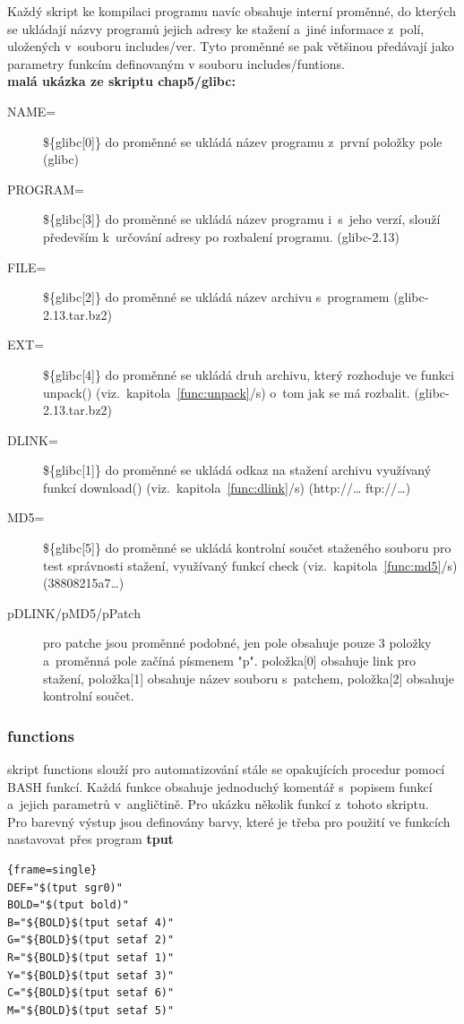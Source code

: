 \documentclass[a4paper,12pt]{article}
\newcommand{\odkazNaKapitolu}[1]{(viz.~kapitola~\ref{#1}/s\pageref{#1})}
\renewcommand{\b}[1]{\textbf{#1}} %
\newenvironment{codeframe}{%
  \begin{Sbox} 
    \begin{minipage} 
      {\columnwidth-\leftmargin-\rightmargin-2\fboxsep-2\fboxrule-4pt} 
}{%

  \end{minipage} 
  \end{Sbox} 
  \begin{center} 
    \fcolorbox{black}{codeback}{\TheSbox} 
  \end{center} 
}
\begin{document}
Každý skript ke kompilaci programu navíc obsahuje interní proměnné, do kterých se ukládají názvy programů jejich adresy ke stažení a~jiné informace z~polí, uložených v~souboru includes/ver. Tyto proměnné se pak většinou předávají jako parametry funkcím definovaným v souboru includes/funtions.\\

\b{malá ukázka ze skriptu chap5/glibc:}
\begin{description}
 \item[NAME=]\$\{glibc[0]\} do proměnné se ukládá název programu z~první položky pole (glibc)
 \item[PROGRAM=]\$\{glibc[3]\} do proměnné se ukládá název programu i~s~jeho verzí, slouží především k~určování adresy po rozbalení programu. (glibc-2.13)
 \item[FILE=]\$\{glibc[2]\} do proměnné se ukládá název archivu s~programem (glibc-2.13.tar.bz2)
 \item[EXT=]\$\{glibc[4]\} do proměnné se ukládá druh archivu, který rozhoduje ve funkci unpack() \odkazNaKapitolu{func:unpack} o~tom jak se má rozbalit. (glibc-2.13.tar.bz2)
 \item[DLINK=]\$\{glibc[1]\} do proměnné se ukládá odkaz na stažení archivu využívaný funkcí download() \odkazNaKapitolu{func:dlink} (http://… ftp://…)
 \item[MD5=]\$\{glibc[5]\} do proměnné se ukládá kontrolní součet staženého souboru pro test správnosti stažení, využívaný funkcí check \odkazNaKapitolu{func:md5} (38808215a7…)
 \item[pDLINK/pMD5/pPatch] pro patche jsou proměnné podobné, jen pole obsahuje pouze 3 položky a~proměnná pole začíná písmenem "p". položka[0] obsahuje link pro stažení, položka[1] obsahuje název souboru s~patchem, položka[2] obsahuje kontrolní součet.
 \end{description}

\subsubsection{functions}
skript functions slouží pro automatizování stále se opakujících procedur pomocí BASH funkcí. Každá funkce obsahuje jednoduchý komentář s~popisem funkcí a~jejich parametrů v~angličtině. Pro ukázku několik funkcí z~tohoto skriptu.\\

Pro barevný výstup jsou definovány barvy, které je třeba pro použití ve funkcích nastavovat přes program \b{tput}
    \begin{codeframe} 
\begin{Verbatim}{frame=single} 
DEF="$(tput sgr0)"
BOLD="$(tput bold)"
B="${BOLD}$(tput setaf 4)"
G="${BOLD}$(tput setaf 2)"
R="${BOLD}$(tput setaf 1)"
Y="${BOLD}$(tput setaf 3)"
C="${BOLD}$(tput setaf 6)"
M="${BOLD}$(tput setaf 5)"
\end{Verbatim} 
    \end{codeframe}
\end{document}
